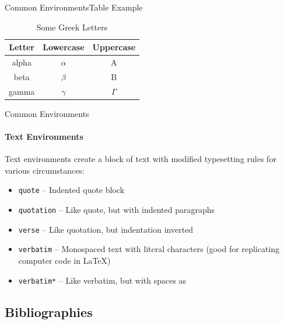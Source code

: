 \documentclass{beamer}
\begin{document}
\begin{frame}{Common Environments}{Table Example}
	\begin{table}[t]
		\caption{Some Greek Letters}
		\begin{tabular}{| c | c | c |}\hline
			Letter & Lowercase & Uppercase\\ \hline
			alpha & $\alpha$ & $\mathrm A$ \\ \hline
			beta & $\beta$ & $\mathrm B$ \\ \hline
			gamma & $\gamma$ & $\Gamma$ \\ \hline
		\end{tabular}
		\label{tbl:greek}
	\end{table}
\end{frame}

\begin{frame}{Common Environments}
\framesubtitle{Text Environments}
Text environments create a block of text with modified typesetting rules for various circumstances:
	\begin{itemize}
		\item \texttt{quote} -- Indented quote block
		\item \texttt{quotation} -- Like quote, but with indented paragraphs
		\item \texttt{verse} -- Like quotation, but indentation inverted
		\item \texttt{verbatim} -- Monospaced text with literal characters (good for replicating computer code in LaTeX)
		\item \texttt{verbatim*} -- Like verbatim, but with spaces as \texttt{}
	\end{itemize}
\end{frame}

\subsection{Bibliographies}
\end{document}
